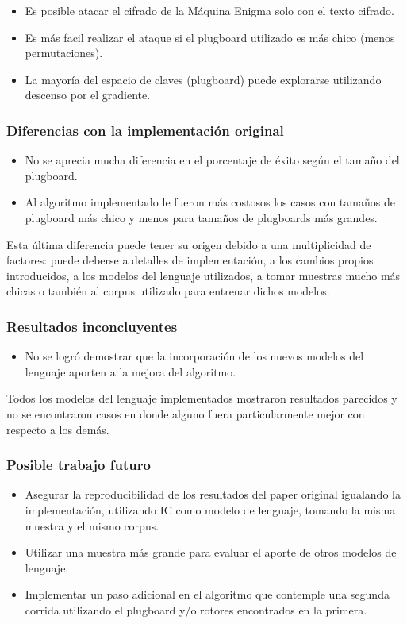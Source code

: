 \documentclass[a4paper,10pt]{article}
\begin{document}
\begin{itemize}
  \item Es posible atacar el cifrado de la Máquina Enigma solo con el texto cifrado.
  \item Es más facil realizar el ataque si el plugboard utilizado es más chico (menos permutaciones).
  \item La mayoría del espacio de claves (plugboard) puede explorarse utilizando descenso por el gradiente.
\end{itemize}

\subsubsection{Diferencias con la implementación original}
\begin{itemize}
  \item No se aprecia mucha diferencia en el porcentaje de éxito según el tamaño del plugboard.
  \item Al algoritmo implementado le fueron más costosos los casos con tamaños de plugboard más chico y menos para tamaños de plugboards más grandes.
\end{itemize}

Esta última diferencia puede tener su origen debido a una multiplicidad de factores: puede deberse a detalles de implementación, a los cambios propios introducidos, a los modelos del lenguaje utilizados, a tomar muestras mucho más chicas o también al corpus utilizado para entrenar dichos modelos.

\subsubsection{Resultados inconcluyentes}
\begin{itemize}
  \item No se logró demostrar que la incorporación de los nuevos modelos del lenguaje aporten a la mejora del algoritmo.
\end{itemize}

Todos los modelos del lenguaje implementados mostraron resultados parecidos y no se encontraron casos en donde alguno fuera particularmente mejor con respecto a los demás.

\subsubsection{Posible trabajo futuro}
\begin{itemize}
  \item Asegurar la reproducibilidad de los resultados del paper original igualando la implementación, utilizando IC como modelo de lenguaje, tomando la misma muestra y el mismo corpus.
  \item Utilizar una muestra más grande para evaluar el aporte de otros modelos de lenguaje.
  \item Implementar un paso adicional en el algoritmo que contemple una segunda corrida utilizando el plugboard y/o rotores encontrados en la primera.
\end{itemize}
\end{document}
